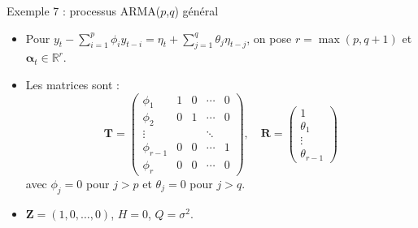 \documentclass[11pt,aspectratio=169]{beamer}
\newcommand{\R}{\mathbb{R}}
\begin{document}
\begin{frame}{Exemple 7 : processus ARMA($p$,$q$) général}

\begin{itemize}

\item Pour $y_t - \sum_{i=1}^p \phi_i y_{t-i} = \eta_t + \sum_{j=1}^q \theta_j \eta_{t-j}$, on pose $r = \max(p, q+1)$ et $\bm{\alpha}_t \in \R^r$.\newline

\item Les matrices sont :
  \[
  \bm{T} = \begin{pmatrix}
      \phi_1 & 1 & 0 & \cdots & 0 \\
      \phi_2 & 0 & 1 & \cdots & 0 \\
      \vdots & & & \ddots & \\
      \phi_{r-1} & 0 & 0 & \cdots & 1 \\
      \phi_r & 0 & 0 & \cdots & 0
  \end{pmatrix}, \quad
  \bm{R} = \begin{pmatrix} 1 \\ \theta_1 \\ \vdots \\ \theta_{r-1} \end{pmatrix}
  \]
  avec $\phi_j = 0$ pour $j > p$ et $\theta_j = 0$ pour $j > q$.\newline

\item $\bm{Z} = (1, 0, \ldots, 0)$, $H = 0$, $Q = \sigma^2$.

\end{itemize}

\end{frame}
\end{document}
